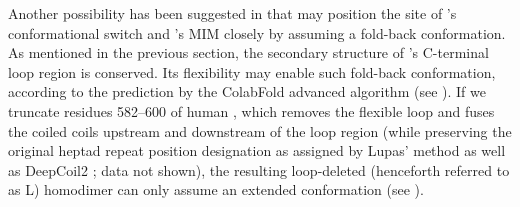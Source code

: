 Another possibility has been suggested in \cite{Structure1GO4, SpMad1} that  may position the site of 's conformational switch and 's MIM closely by assuming a fold-back conformation. As mentioned in the previous section, the secondary structure of 's C-terminal loop region is conserved. Its flexibility may enable such fold-back conformation, according to the prediction by the ColabFold advanced algorithm (see ). If we truncate residues 582--600 of human , which removes the flexible loop and fuses the coiled coils upstream and downstream of the loop region (while preserving the original heptad repeat position designation as assigned by Lupas' method \cite{LupasCOILS} as well as DeepCoil2 \cite{DeepCoil}; data not shown), the resulting loop-deleted  (henceforth referred to as \textDelta{}L) homodimer can only assume an extended conformation (see ).


